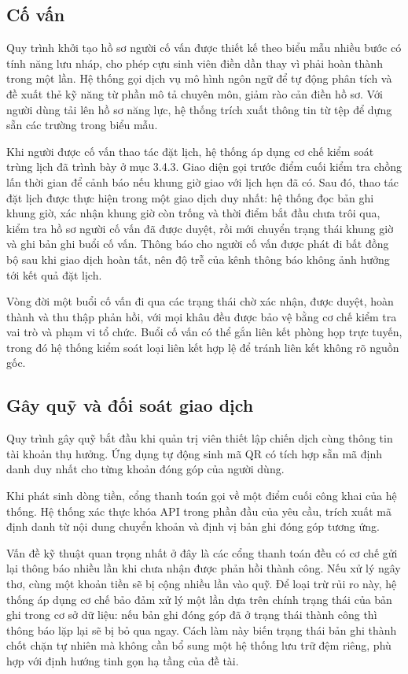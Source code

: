 \documentclass[12pt,a4paper,oneside]{report}
\begin{document}
\subsection{Cố vấn}

Quy trình khởi tạo hồ sơ người cố vấn được thiết kế theo biểu mẫu nhiều bước có tính năng lưu nháp, cho phép cựu sinh viên điền dần thay vì phải hoàn thành trong một lần. Hệ thống gọi dịch vụ mô hình ngôn ngữ để tự động phân tích và đề xuất thẻ kỹ năng từ phần mô tả chuyên môn, giảm rào cản điền hồ sơ. Với người dùng tải lên hồ sơ năng lực, hệ thống trích xuất thông tin từ tệp để dựng sẵn các trường trong biểu mẫu.

Khi người được cố vấn thao tác đặt lịch, hệ thống áp dụng cơ chế kiểm soát trùng lịch đã trình bày ở mục 3.4.3. Giao diện gọi trước điểm cuối kiểm tra chồng lấn thời gian để cảnh báo nếu khung giờ giao với lịch hẹn đã có. Sau đó, thao tác đặt lịch được thực hiện trong một giao dịch duy nhất: hệ thống đọc bản ghi khung giờ, xác nhận khung giờ còn trống và thời điểm bắt đầu chưa trôi qua, kiểm tra hồ sơ người cố vấn đã được duyệt, rồi mới chuyển trạng thái khung giờ và ghi bản ghi buổi cố vấn. Thông báo cho người cố vấn được phát đi bất đồng bộ sau khi giao dịch hoàn tất, nên độ trễ của kênh thông báo không ảnh hưởng tới kết quả đặt lịch.

Vòng đời một buổi cố vấn đi qua các trạng thái chờ xác nhận, được duyệt, hoàn thành và thu thập phản hồi, với mọi khâu đều được bảo vệ bằng cơ chế kiểm tra vai trò và phạm vi tổ chức. Buổi cố vấn có thể gắn liên kết phòng họp trực tuyến, trong đó hệ thống kiểm soát loại liên kết hợp lệ để tránh liên kết không rõ nguồn gốc.

\subsection{Gây quỹ và đối soát giao dịch}

Quy trình gây quỹ bắt đầu khi quản trị viên thiết lập chiến dịch cùng thông tin tài khoản thụ hưởng. Ứng dụng tự động sinh mã QR có tích hợp sẵn mã định danh duy nhất cho từng khoản đóng góp của người dùng.

Khi phát sinh dòng tiền, cổng thanh toán gọi về một điểm cuối công khai của hệ thống. Hệ thống xác thực khóa API trong phần đầu của yêu cầu, trích xuất mã định danh từ nội dung chuyển khoản và định vị bản ghi đóng góp tương ứng.

Vấn đề kỹ thuật quan trọng nhất ở đây là các cổng thanh toán đều có cơ chế gửi lại thông báo nhiều lần khi chưa nhận được phản hồi thành công. Nếu xử lý ngây thơ, cùng một khoản tiền sẽ bị cộng nhiều lần vào quỹ. Để loại trừ rủi ro này, hệ thống áp dụng cơ chế bảo đảm xử lý một lần dựa trên chính trạng thái của bản ghi trong cơ sở dữ liệu: nếu bản ghi đóng góp đã ở trạng thái thành công thì thông báo lặp lại sẽ bị bỏ qua ngay. Cách làm này biến trạng thái bản ghi thành chốt chặn tự nhiên mà không cần bổ sung một hệ thống lưu trữ đệm riêng, phù hợp với định hướng tinh gọn hạ tầng của đề tài.
\end{document}

